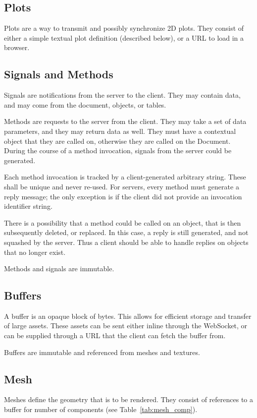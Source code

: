 \documentclass[11pt, oneside]{amsart}
\begin{document}
\subsection{Plots}
Plots are a way to transmit and possibly synchronize 2D plots. They consist of either a simple textual plot definition (described below), or a URL to load in a browser.

\subsection{Signals and Methods}
Signals are notifications from the server to the client. They may contain data, and may come from the document, objects, or tables.

Methods are requests to the server from the client. They may take a set of data parameters, and they may return data as well. They must have a contextual object that they are called on, otherwise they are called on the Document. During the course of a method invocation, signals from the server could be generated.

Each method invocation is tracked by a client-generated arbitrary string. These shall be unique and never re-used. For servers, every method must generate a reply message; the only exception is if the client did not provide an invocation identifier string.

There is a possibility that a method could be called on an object, that is then subsequently deleted, or replaced. In this case, a reply is still generated, and not squashed by the server. Thus a client should be able to handle replies on objects that no longer exist.

Methods and signals are immutable.

\subsection{Buffers}
A buffer is an opaque block of bytes. This allows for efficient storage and transfer of large assets. These assets can be sent either inline through the WebSocket, or can be supplied through a URL that the client can fetch the buffer from.

Buffers are immutable and referenced from meshes and textures.

\subsection{Mesh}
Meshes define the geometry that is to be rendered. They consist of references to a buffer for number of components (see Table~\ref{tab:mesh_comp}).
\end{document}
